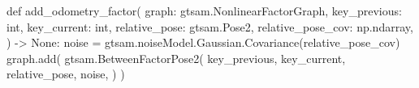 \begin{pythoncode}
def add_odometry_factor(
    graph: gtsam.NonlinearFactorGraph,
    key_previous: int,
    key_current: int,
    relative_pose: gtsam.Pose2,
    relative_pose_cov: np.ndarray,
) -> None:
    noise = gtsam.noiseModel.Gaussian.Covariance(relative_pose_cov)
    graph.add(
        gtsam.BetweenFactorPose2(
            key_previous,
            key_current,
            relative_pose,
            noise,
        )
    )
\end{pythoncode}
